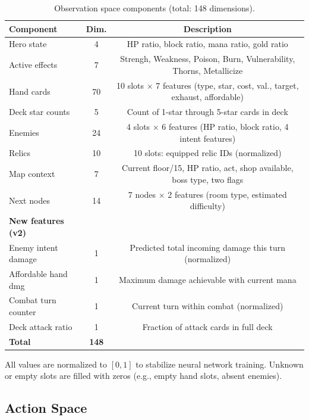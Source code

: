 \begin{table}[H]
    \centering
    \caption{Observation space components (total: 148 dimensions).}
    \label{tab:obs_space}
    \begin{tabular}{lcc}
        \toprule
        \textbf{Component} & \textbf{Dim.} & \textbf{Description} \\
        \midrule
        Hero state         & 4  & HP ratio, block ratio, mana ratio, gold ratio \\
        Active effects     & 7  & Strengh, Weakness, Poison, Burn, Vulnerability, Thorns, Metallicize \\
        Hand cards         & 70 & 10 slots $\times$ 7 features (type, star, cost, val., target, exhaust, affordable) \\
        Deck star counts   & 5  & Count of 1-star through 5-star cards in deck \\
        Enemies            & 24 & 4 slots $\times$ 6 features (HP ratio, block ratio, 4 intent features) \\
        Relics             & 10 & 10 slots: equipped relic IDs (normalized) \\
        Map context        & 7  & Current floor/15, HP ratio, act, shop available, boss type, two flags \\
        Next nodes         & 14 & 7 nodes $\times$ 2 features (room type, estimated difficulty) \\
        \midrule
        \textbf{New features (v2)} & & \\
        Enemy intent damage & 1  & Predicted total incoming damage this turn (normalized) \\
        Affordable hand dmg & 1  & Maximum damage achievable with current mana \\
        Combat turn counter & 1  & Current turn within combat (normalized) \\
        Deck attack ratio   & 1  & Fraction of attack cards in full deck \\
        \midrule
        \textbf{Total} & \textbf{148} & \\
        \bottomrule
    \end{tabular}
\end{table}

All values are normalized to $[0, 1]$ to stabilize neural network training. Unknown or empty slots are filled with zeros (e.g., empty hand slots, absent enemies).

\subsection{Action Space}

